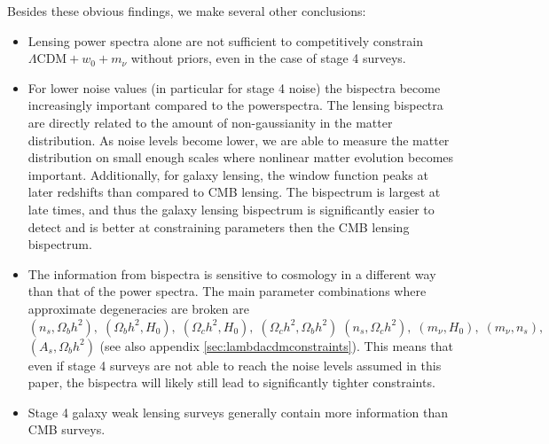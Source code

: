 \documentclass[11pt]{article} %
\begin{document}
Besides these obvious findings, we make several other conclusions:
\begin{itemize}
    \item Lensing power spectra alone are not sufficient to competitively constrain $\Lambda\mathrm{CDM} + w_0 + m_\nu$ without priors, even in the case of stage 4 surveys.

    \item For lower noise values (in particular for stage 4 noise) the bispectra become increasingly important compared to the powerspectra. The lensing bispectra are directly related to the amount of non-gaussianity in the matter distribution. As noise levels become lower, we are able to measure the matter distribution on small enough scales where nonlinear matter evolution becomes important. Additionally, for galaxy lensing, the window function peaks at later redshifts than compared to CMB lensing. The bispectrum is largest at late times, and thus the galaxy lensing bispectrum is significantly easier to detect and is better at constraining parameters then the CMB lensing bispectrum.

    \item The information from bispectra is sensitive to cosmology in a different way than that of the power spectra. The main parameter combinations where approximate degeneracies are broken are $(n_s,\Omega_b h^2),\;(\Omega_b h^2,H_0),\;(\Omega_c h^2,H_0),\;(\Omega_c h^2,\Omega_b h^2)\;(n_s,\Omega_c h^2),\;(m_\nu,H_0),\;(m_\nu,n_s),$ $(A_s,\Omega_b h^2)$ (see also appendix \ref{sec:lambdacdmconstraints}). This means that even if stage 4 surveys are not able to reach the noise levels assumed in this paper, the bispectra will likely still lead to significantly tighter constraints.

    \item Stage 4 galaxy weak lensing surveys generally contain more information than CMB surveys. 
\end{itemize}
\end{document}
